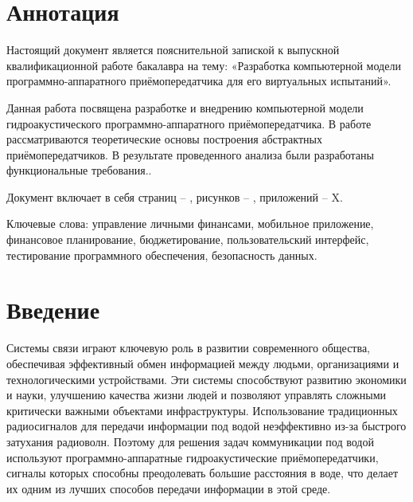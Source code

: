 \documentclass[
    numbers=section,
    document-code={ВКРБ--09.03.04--10.19--XX--26--81}
]{../latex/fqw}
\begin{document}
    \FqwEnableDocumentCodeHeader


    \section*{Аннотация}\label{sec:annotation}

    Настоящий документ является пояснительной запиской к выпускной
    квалификационной работе бакалавра на тему: «Разработка компьютерной
    модели программно-аппаратного приёмопередатчика для его виртуальных
    испытаний».

    Данная работа посвящена разработке и внедрению компьютерной модели
    гидроакустического программно-аппаратного приёмопередатчика.
    В работе рассматриваются теоретические основы построения абстрактных
    приёмопередатчиков.
    В результате проведенного анализа были разработаны функциональные требования..

    Документ включает в себя страниц -- \pageref{LastPage}, рисунков -- , приложений -- X.

    Ключевые слова:
    управление личными финансами,
    мобильное приложение,
    финансовое планирование,
    бюджетирование,
    пользовательский интерфейс,
    тестирование программного обеспечения,
    безопасность данных.

    \clearpage
    \tableofcontents
    \clearpage


    \section*{Введение}\label{sec:introduction}
    \vspace{\baselineskip}

    Системы связи играют ключевую роль в развитии современного общества, обеспечивая эффективный обмен информацией между
    людьми, организациями и технологическими устройствами.
    Эти системы способствуют развитию экономики и науки, улучшению качества жизни людей и позволяют управлять сложными
    критически важными объектами инфраструктуры.
    Использование традиционных радиосигналов для передачи информации под водой неэффективно из-за быстрого затухания
    радиоволн\nbspace\cite[гл.~1]{urikOsnovyGidroakustiki1978}. %
    Поэтому для решения задач коммуникации под водой используют программно-аппаратные гидроакустические
    приёмопередатчики, сигналы которых способны преодолевать большие расстояния в воде, что делает их одним из лучших
    способов передачи информации в этой среде.
\end{document}

